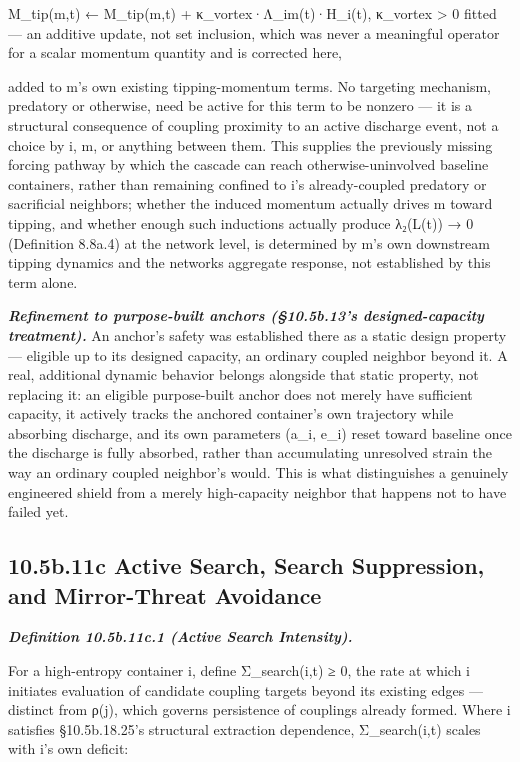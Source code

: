 \documentclass[
]{article}
\begin{document}
M\_tip(m,t) ← M\_tip(m,t) + κ\_vortex·Λ\_im(t)·H\_i(t), κ\_vortex
\textgreater{} 0 fitted --- an additive update, not set inclusion, which
was never a meaningful operator for a scalar momentum quantity and is
corrected here,

added to m's own existing tipping-momentum terms. No targeting
mechanism, predatory or otherwise, need be active for this term to be
nonzero --- it is a structural consequence of coupling proximity to an
active discharge event, not a choice by i, m, or anything between them.
This supplies the previously missing forcing pathway by which the
cascade can reach otherwise-uninvolved baseline containers, rather than
remaining confined to i's already-coupled predatory or sacrificial
neighbors; whether the induced momentum actually drives m toward
tipping, and whether enough such inductions actually produce λ₂(L(t)) →
0 (Definition 8.8a.4) at the network level, is determined by m's own
downstream tipping dynamics and the networks aggregate response, not
established by this term alone.

\emph{\textbf{Refinement to purpose-built anchors (§10.5b.13's
designed-capacity treatment).}} An anchor's safety was established there
as a static design property --- eligible up to its designed capacity, an
ordinary coupled neighbor beyond it. A real, additional dynamic behavior
belongs alongside that static property, not replacing it: an eligible
purpose-built anchor does not merely have sufficient capacity, it
actively tracks the anchored container's own trajectory while absorbing
discharge, and its own parameters (a\_i, e\_i) reset toward baseline
once the discharge is fully absorbed, rather than accumulating
unresolved strain the way an ordinary coupled neighbor's would. This is
what distinguishes a genuinely engineered shield from a merely
high-capacity neighbor that happens not to have failed yet.

\hypertarget{b.11c-active-search-search-suppression-and-mirror-threat-avoidance}{%
\subsection{10.5b.11c Active Search, Search Suppression, and
Mirror-Threat
Avoidance}\label{b.11c-active-search-search-suppression-and-mirror-threat-avoidance}}

\emph{\textbf{Definition 10.5b.11c.1 (Active Search Intensity).}}

For a high-entropy container i, define Σ\_search(i,t) ≥ 0, the rate at
which i initiates evaluation of candidate coupling targets beyond its
existing edges --- distinct from ρ(j), which governs persistence of
couplings already formed. Where i satisfies §10.5b.18.25's structural
extraction dependence, Σ\_search(i,t) scales with i's own deficit:
\end{document}
